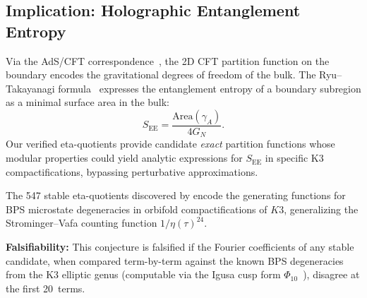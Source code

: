\subsection{Implication: Holographic Entanglement Entropy}

Via the AdS/CFT correspondence~\cite{maldacena_1998}, the 2D CFT partition function on the boundary encodes the gravitational degrees of freedom of the bulk. The Ryu--Takayanagi formula~\cite{ryu_takayanagi_2006} expresses the entanglement entropy of a boundary subregion as a minimal surface area in the bulk:
\begin{equation}
  S_{\mathrm{EE}} = \frac{\mathrm{Area}(\gamma_A)}{4G_N}.
\end{equation}
Our verified eta-quotients provide candidate \emph{exact} partition functions whose modular properties could yield analytic expressions for $S_{\mathrm{EE}}$ in specific K3 compactifications, bypassing perturbative approximations.

\begin{conjecture}
The 547 stable eta-quotients discovered by \RAMA{} encode the generating functions for BPS microstate degeneracies in orbifold compactifications of $K3$, generalizing the Strominger--Vafa counting function $1/\eta(\tau)^{24}$.
\end{conjecture}

\textbf{Falsifiability:} This conjecture is falsified if the Fourier coefficients of any stable candidate, when compared term-by-term against the known BPS degeneracies from the K3 elliptic genus (computable via the Igusa cusp form $\Phi_{10}$~\cite{dijkgraaf_verlinde_verlinde}), disagree at the first 20~terms.
